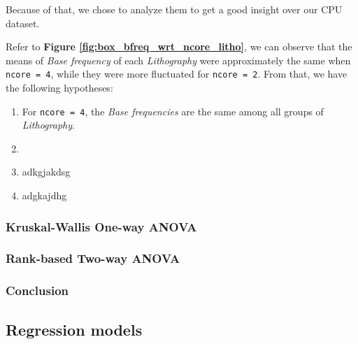 Because of that, we chose to analyze them to get a good insight over our CPU dataset.

Refer to \textbf{Figure \ref{fig:box_bfreq_wrt_ncore_litho}}, we can observe that the means of \textit{Base frequency} 
of each \textit{Lithography} were approximately the same when \verb|ncore = 4|, while they were more fluctuated for \verb|ncore = 2|.
From that, we have the following hypotheses:
\begin{enumerate}
    \item For \verb|ncore = 4|, the \textit{Base frequencies} are the same among all groups of \textit{Lithography}.
    \item 
    \item adkgjakdsg
    \item adgkajdhg
\end{enumerate}

\subsubsection{Kruskal-Wallis One-way ANOVA}

\subsubsection{Rank-based Two-way ANOVA}

\subsubsection{Conclusion}





\subsection{Regression models}
